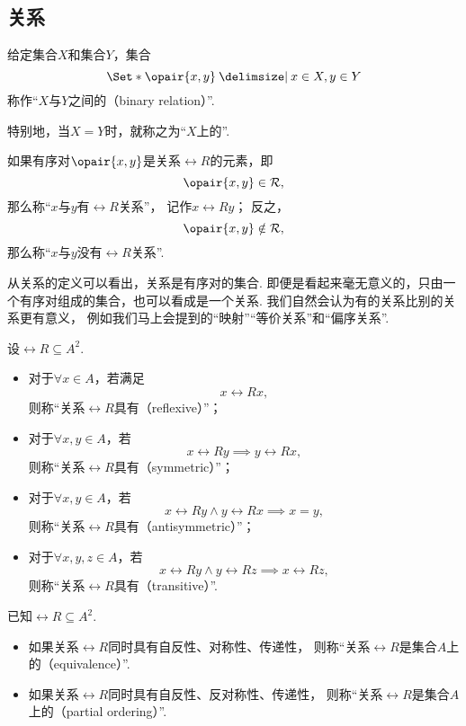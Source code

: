 \subsection{关系}
\begin{definition}
给定集合\(X\)和集合\(Y\)，集合\[
	\Set*{ \opair{x,y} \given x \in X, y \in Y }
\]
称作“\(X\)与\(Y\)之间的（binary relation）”.

特别地，当\(X = Y\)时，就称之为“\(X\)上的”.
\end{definition}

如果有序对\(\opair{x,y}\)是关系\(\rel{R}\)的元素，即\[
	\opair{x,y} \in \rel{R},
\]
那么称“\(x\)与\(y\)有\(\rel{R}\)关系”，
记作\(x\rel{R}y\)；
反之，\[
	\opair{x,y} \notin \rel{R},
\]
那么称“\(x\)与\(y\)没有\(\rel{R}\)关系”.

从关系的定义可以看出，关系是有序对的集合.
即便是看起来毫无意义的，只由一个有序对组成的集合，也可以看成是一个关系.
我们自然会认为有的关系比别的关系更有意义，
例如我们马上会提到的“映射”“等价关系”和“偏序关系”.

\begin{definition}
设\(\rel{R} \subseteq A^2\).
\begin{itemize}
	\item 对于\(\forall x \in A\)，若满足\[
		x\rel{R}x,
	\]
	则称“关系\(\rel{R}\)具有（reflexive）”；

	\item 对于\(\forall x,y \in A\)，若\[
		x\rel{R}y \implies y\rel{R}x,
	\]
	则称“关系\(\rel{R}\)具有（symmetric）”；

	\item 对于\(\forall x,y \in A\)，若\[
		x\rel{R}y \land y\rel{R}x \implies x = y,
	\]
	则称“关系\(\rel{R}\)具有（antisymmetric）”；

	\item 对于\(\forall x,y,z \in A\)，若\[
		x\rel{R}y \land y\rel{R}z \implies x\rel{R}z,
	\]
	则称“关系\(\rel{R}\)具有（transitive）”.
\end{itemize}
\end{definition}

\begin{definition}
已知\(\rel{R} \subseteq A^2\).
\begin{itemize}
	\item 如果关系\(\rel{R}\)同时具有自反性、对称性、传递性，
	则称“关系\(\rel{R}\)是集合\(A\)上的（equivalence）”.

	\item 如果关系\(\rel{R}\)同时具有自反性、反对称性、传递性，
	则称“关系\(\rel{R}\)是集合\(A\)上的（partial ordering）”.
\end{itemize}
\end{definition}

